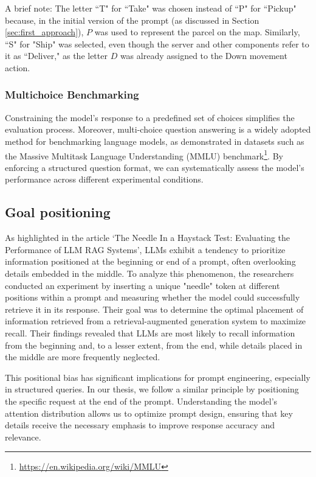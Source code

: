 A brief note: The letter ``T" for ``Take" was chosen instead of ``P" for ``Pickup"
because, in the initial version of the prompt (as discussed in Section \ref{sec:first_approach}),
$P$ was used to represent the parcel on the map. Similarly, ``S" for "Ship" was
selected, even though the server and other components refer to it as ``Deliver,"
as the letter $D$ was already assigned to the Down movement action.

\subsubsection{Multichoice Benchmarking}

Constraining the model's response to a predefined set of choices simplifies the
evaluation process. Moreover, multi-choice question answering is a widely
adopted method for benchmarking language models, as demonstrated in datasets such
as the Massive Multitask Language Understanding (MMLU) benchmark\footnote{\url{https://en.wikipedia.org/wiki/MMLU}}.
By enforcing a structured question format, we can systematically assess the
model's performance across different experimental conditions.

\subsection{Goal positioning}
\label{sub:goal_positioning}

As highlighted in the article `The Needle In a Haystack Test: Evaluating the Performance
of LLM RAG Systems'\cite{needleRAG}, LLMs exhibit a tendency to prioritize
information positioned at the beginning or end of a prompt, often overlooking details
embedded in the middle. To analyze this phenomenon, the researchers conducted an
experiment by inserting a unique "needle" token at different positions within a prompt
and measuring whether the model could successfully retrieve it in its response.
Their goal was to determine the optimal placement of information retrieved from
a retrieval-augmented generation system to maximize recall. Their findings revealed
that LLMs are most likely to recall information from the beginning and, to a
lesser extent, from the end, while details placed in the middle are more
frequently neglected.

This positional bias has significant implications for prompt engineering, especially
in structured queries. In our thesis, we follow a similar principle by positioning
the specific request at the end of the prompt. Understanding the model's
attention distribution allows us to optimize prompt design, ensuring that key details
receive the necessary emphasis to improve response accuracy and relevance.

